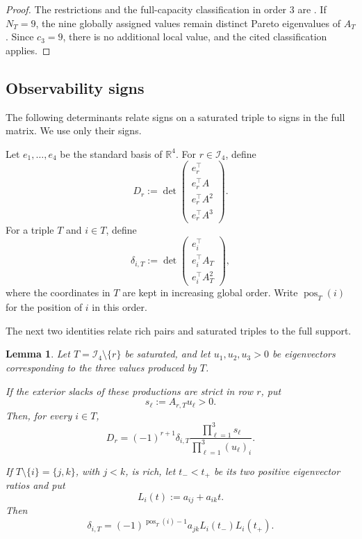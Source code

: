 \documentclass[11pt,a4paper]{article}
\newtheorem{lemma}[theorem]{Lemma}
\theoremstyle{definition}
\newcommand{\R}{\mathbb R}
\newcommand{\Ind}{\mathcal I}
\begin{document}
\begin{proof}
The restrictions and the full-capacity classification in order $3$
are \cite[Lemmas~3.5-3.7 and Theorem~5.1]{Adly2026}. If $N_T=9$, the
nine globally assigned values remain distinct Pareto eigenvalues of
$A_T$. Since $c_3=9$, there is no additional local value, and the cited
classification applies.
\end{proof}

\subsection{Observability signs}

The following determinants relate signs on a saturated triple to signs
in the full matrix. We use only their signs.

Let $e_1,\ldots,e_4$ be the standard basis of $\R^4$.
For $r\in\Ind_4$, define
$$
D_r
:=
\det
\begin{pmatrix}
e_r^\top\\
e_r^\top A\\
e_r^\top A^2\\
e_r^\top A^3
\end{pmatrix}.
$$
For a triple $T$ and $i\in T$, define
$$
\delta_{i,T}
:=
\det
\begin{pmatrix}
e_i^\top\\
e_i^\top A_T\\
e_i^\top A_T^2
\end{pmatrix},
$$
where the coordinates in $T$ are kept in increasing global order.
Write $\operatorname{pos}_T(i)$ for the position of $i$ in this order.

The next two identities relate rich pairs and saturated triples to the
full support.

\begin{lemma}
\label{lem:determinant-identities}
Let $T=\Ind_4\setminus\{r\}$ be saturated, and let
$u_1,u_2,u_3>0$ be eigenvectors corresponding to the three values
produced by $T$.

If the exterior slacks of these productions are strict in row $r$, put
$$
s_\ell:=A_{r,T}u_\ell>0.
$$
Then, for every $i\in T$,
$$
D_r
=
(-1)^{r+1}\delta_{i,T}
\frac{\prod_{\ell=1}^3s_\ell}
{\prod_{\ell=1}^3(u_\ell)_i}.
$$

If $T\setminus\{i\}=\{j,k\}$, with $j<k$, is rich, let
$t_-<t_+$ be its two positive eigenvector ratios and put
$$
L_i(t):=a_{ij}+a_{ik}t.
$$
Then
$$
\delta_{i,T}
=
(-1)^{\operatorname{pos}_T(i)-1}
a_{jk}L_i(t_-)L_i(t_+).
$$
\end{lemma}
\end{document}

